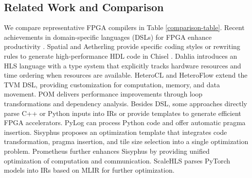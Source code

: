 \documentclass[conference]{IEEEtran}
\begin{document}
\subsection{Related Work and Comparison}\label{related work}
We compare representative FPGA compilers 
in Table \ref{comparison-table}. 
Recent achievements in domain-specific languages (DSLs) for FPGA enhance productivity \cite{spatial2018, aetherling2020, lai2019heterocl, xiang2022heteroflow, huang2021pylog, zhang2024pom}. Spatial \cite{spatial2018} and Aetherling \cite{aetherling2020} provide specific coding styles or rewriting rules to generate high-performance HDL code in Chisel \cite{chisel2012}. 
Dahlia \cite{dahlia2020pldi} introduces an HLS language with a type system that explicitly tracks hardware resources and time ordering when resources are available.
HeteroCL \cite{lai2019heterocl} and HeteroFlow \cite{xiang2022heteroflow} extend the TVM DSL, providing customization for computation, memory, and data movement. 
POM \cite{zhang2024pom} delivers performance improvements
through loop transformations and dependency analysis.  
Besides DSL, some approaches directly parse C++ or Python inputs into IRs or provide  templates to generate efficient FPGA accelerators. 
PyLog \cite{huang2021pylog} can process Python code and offer automatic pragma insertion.
Sisyphus \cite{Sisyphusfpga25} proposes an optimization template that integrates code transformation, pragma insertion, and tile size selection into a single optimization problem. Prometheus \cite{Prometheus2025} further enhances Sisyphus by providing unified optimization of computation and communication. ScaleHLS \cite{ye2022scalehls} parses PyTorch models into IRs based on MLIR for further optimization.
\end{document}
